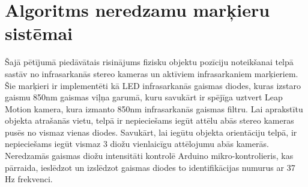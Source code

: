 \documentclass[12pt, a4paper, oneside, openright]{article}
\begin{document}

\newpage
\section{Algoritms neredzamu marķieru sistēmai}\label{section_imaging}

\par
Šajā pētījumā piedāvātais risinājums fizisku objektu pozīciju noteikšanai telpā sastāv no infrasarkanās
stereo kameras un aktīviem infrasarkaniem marķieriem. Šie marķieri ir implementēti kā LED infrasarkanās
gaismas diodes, kuras izstaro gaismu 850nm gaismas viļņa garumā, kuru savukārt ir spējīga uztvert
Leap Motion kamera, kura izmanto 850nm infrasarkanās gaismas filtru. Lai aprakstītu objekta atrašanās
vietu, telpā ir nepieciešams iegūt attēlu abās stereo kameras pusēs no vismaz vienas diodes. Savukārt,
lai iegūtu objekta orientāciju telpā, ir nepieciešams iegūt vismaz 3 diožu vienlaicīgu attēlojumu abās
kamerās. Neredzamās gaismas diožu intensitāti kontrolē Arduino mikro-kontrolieris, kas pārraida, ieslēdzot 
un izslēdzot gaismas diodes to identifikācijas numurus ar 37 Hz frekvenci. 

\par
\end{document}
